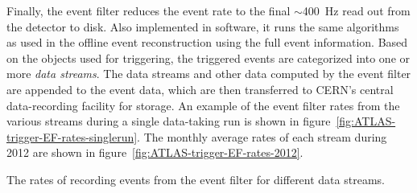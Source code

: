 Finally, the event filter reduces the event rate to the final $\sim$\SI{400}{\hertz} read out from the detector to disk. Also implemented in software, it runs the same algorithms as used in the offline event reconstruction using the full event information. Based on the objects used for triggering, the triggered events are categorized into one or more \emph{data streams}. The data streams and other data computed by the event filter are appended to the event data, which are then transferred to CERN’s central data-recording facility for storage. An example of the event filter rates from the various streams during a single data-taking run is shown in figure~\ref{fig:ATLAS-trigger-EF-rates-singlerun}. The monthly average rates of each stream during 2012 are shown in figure~\ref{fig:ATLAS-trigger-EF-rates-2012}.

\begin{table}[htbp]
	\centering
	\hfill
	\caption{The rates of recording events from the event filter for different data streams.}
	\label{fig:ATLAS-trigger-EF-rates}
\end{table}


